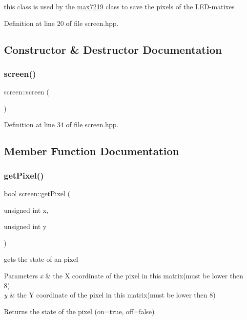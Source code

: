 this class is used by the \mbox{\hyperlink{classmax7219}{max7219}} class to save the pixels of the L\+E\+D-\/matixes 

Definition at line 20 of file screen.\+hpp.



\subsection{Constructor \& Destructor Documentation}
\mbox{\label{classscreen_a926d04fbd3d3e5b721b7751512a6c027}} 
\subsubsection{\texorpdfstring{screen()}{screen()}}
{\footnotesize\ttfamily screen\+::screen (\begin{DoxyParamCaption}{ }\end{DoxyParamCaption})\hspace{0.3cm}{\ttfamily [inline]}}



Definition at line 34 of file screen.\+hpp.



\subsection{Member Function Documentation}
\mbox{\label{classscreen_a00b5d23df677adb98f741a0aa09ef499}} 
\subsubsection{\texorpdfstring{get\+Pixel()}{getPixel()}}
{\footnotesize\ttfamily bool screen\+::get\+Pixel (\begin{DoxyParamCaption}\item[{unsigned int}]{x,  }\item[{unsigned int}]{y }\end{DoxyParamCaption})}



gets the state of an pixel 


\begin{DoxyParams}{Parameters}
{\em x} & the X coordinate of the pixel in this matrix(must be lower then 8) \\
\hline
{\em y} & the Y coordinate of the pixel in this matrix(must be lower then 8) \\
\hline
\end{DoxyParams}
\begin{DoxyReturn}{Returns}
the state of the pixel (on=true, off=false) 
\end{DoxyReturn}


